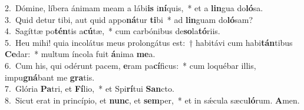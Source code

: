{2.~}Dómine, líbera ánimam meam a lábi\textbf{is} i\textbf{ní}quis,~* et a \textbf{lin}gua do\textbf{ló}sa.\\
{3.~}Quid detur tibi, aut quid appo\textbf{ná}tur \textbf{ti}bi~* ad \textbf{lin}guam do\textbf{ló}sam?\\
{4.~}Sagíttæ po\textbf{tén}tis a\textbf{cú}tæ,~* cum carbónibus de\textbf{so}la\textbf{tó}riis.\\
{5.~}Heu mihi! quia incolátus meus prolongátus est:~† habitávi cum habi\textbf{tán}tibus \textbf{Ce}dar:~* multum íncola fuit \textbf{á}nima \textbf{me}a.\\
{6.~}Cum his, qui odérunt pacem, \textbf{e}ram pa\textbf{cí}ficus:~* cum loquébar illis, impu\textbf{gná}bant me \textbf{gra}tis.\\
{7.~}Glória \textbf{Pa}tri, et \textbf{Fí}lio,~* et Spi\textbf{rí}tui \textbf{San}cto.\\
{8.~}Sicut erat in princípio, et \textbf{nunc}, et \textbf{sem}per,~* et in sǽcula sæcu\textbf{ló}rum. \textbf{A}men.\\
